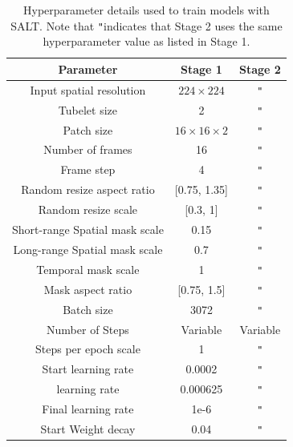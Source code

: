 \documentclass{applemlr}
\numberwithin{equation}{section}
\newcommand{\ourmethod}{SALT\xspace}
\newcommand{\ditto}{\texttt{"}}
\begin{document}
\begin{table}[htbp]
    \centering
    \caption{Hyperparameter details used to train models with \ourmethod. Note that \ditto indicates that Stage 2 uses the same hyperparameter value as listed in Stage 1.}
    \label{tab:appendix:training_details}

    \begin{tabular}{ccc}
        \toprule
        Parameter & Stage 1 & Stage 2 \\
        \midrule
        Input spatial resolution        & $224 \times 224$          & \ditto \\
        Tubelet size                    & 2                         & \ditto \\
        Patch size                      & $16 \times 16 \times 2$   & \ditto \\
        Number of frames                & 16                        & \ditto \\
        Frame step                      & 4                         & \ditto \\
        Random resize aspect ratio      & [0.75, 1.35]              & \ditto \\
        Random resize scale             & [0.3, 1]                  & \ditto \\
        Short-range Spatial mask scale  & 0.15                      & \ditto \\
        Long-range Spatial mask scale   & 0.7                       & \ditto \\
        Temporal mask scale             & 1                         & \ditto \\
        Mask aspect ratio               & [0.75, 1.5]               & \ditto \\ 
        Batch size                      & 3072                      & \ditto \\
        Number of Steps                 & Variable                  & Variable \\
        Steps per epoch scale           & 1                         & \ditto \\ 
        Start learning rate             &  0.0002                      & \ditto \\
        learning rate                   &  0.000625                      & \ditto \\
        Final learning rate             &  1e-6                      & \ditto \\
        Start Weight decay              &  0.04                      & \ditto  \\

\end{tabular}
\end{table}
\end{document}
